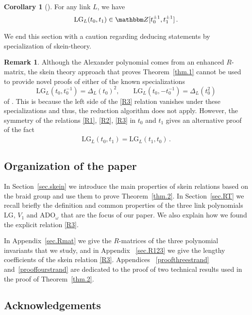 \documentclass[12pt,reqno]{amsart}
\theoremstyle{definition}
\newtheorem{remark}[theorem]{Remark}
\newtheorem{corollary}[theorem]{Corollary}
\def\BZ{\mathbbm Z}
\def\be{\begin{equation}}
\def\ee{\end{equation}}
\def\LG{\mathrm{LG}}
\def\ADO{\mathrm{ADO}}
\begin{document}
\begin{corollary}[{\cite[Thm.1]{Ish}}]
For any link $L$, we have
\be
\LG_L(t_0,t_1) \in \BZ[t_0^{\pm 1},t_1^{\pm 1}] \,.
\ee
\end{corollary}

We end this section with a caution regarding deducing statements by specialization
of skein-theory.

\begin{remark}
\label{rem.noskein}
Although the Alexander polynomial comes from an enhanced $R$-matrix, the skein
theory approach that proves Theorem~\ref{thm.1} cannot be used to provide
novel proofs of either of the known specializations
\be
\LG_L(t_0,t_0^{-1})=\Delta_L(t_0)^2, \qquad \LG_L(t_0,-t_0^{-1})=\Delta_L(t_0^2)
\ee
of \cite{DWIL, Ish, Ko, KoPat}. This is because the left side of the \eqref{R3} relation
vanishes under these specializations and thus, the reduction algorithm does
not apply. However, the symmetry of the relations \eqref{R1}, \eqref{R2},
\eqref{R3} in $t_0$ and $t_1$ gives an alternative proof of the fact 
\be
\begin{aligned}
\LG_L(t_0,t_1)=\LG_L(t_1,t_0)\,.
\end{aligned}
\ee
\end{remark}



\subsection{Organization of the paper}

In Section~\ref{sec.skein} we introduce the main properties of skein
relations based on the braid group and use them to prove Theorem~\ref{thm.2}. In
Section~\ref{sec.RT} we recall briefly the definition and common properties
of the three link polynomials $\LG$, $V_1$ and $\ADO_\omega$ that are the focus
of our paper. We also explain how we found the explicit relation \eqref{R3}.

In Appendix~\ref{sec.Rmat} we give the $R$-matrices of the three polynomial
invariants that we study, and in Appendix ~\ref{sec.R123} we give the
lengthy coefficients of the skein relation \eqref{R3}. Appendices
~\ref{proofthreestrand} and~\ref{prooffourstrand} are dedicated to the proof of two
technical results used in the proof of Theorem~\ref{thm.2}.

\subsection*{Acknowledgements}
\end{document}
